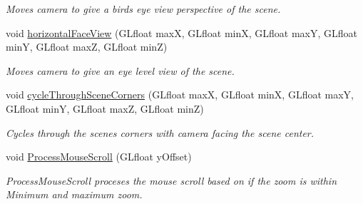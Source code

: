 \begin{DoxyCompactItemize}
\begin{DoxyCompactList}\small\item\em Moves camera to give a birds eye view perspective of the scene. \end{DoxyCompactList}\item 
\hypertarget{class_camera_aa5dbecd3eb846f229b325633ca62d711}{}void \hyperlink{class_camera_aa5dbecd3eb846f229b325633ca62d711}{horizontal\+Face\+View} (G\+Lfloat max\+X, G\+Lfloat min\+X, G\+Lfloat max\+Y, G\+Lfloat min\+Y, G\+Lfloat max\+Z, G\+Lfloat min\+Z)\label{class_camera_aa5dbecd3eb846f229b325633ca62d711}

\begin{DoxyCompactList}\small\item\em Moves camera to give an eye level view of the scene. \end{DoxyCompactList}\item 
\hypertarget{class_camera_aaf646454821cf05e45c5cd30d185d31a}{}void \hyperlink{class_camera_aaf646454821cf05e45c5cd30d185d31a}{cycle\+Through\+Scene\+Corners} (G\+Lfloat max\+X, G\+Lfloat min\+X, G\+Lfloat max\+Y, G\+Lfloat min\+Y, G\+Lfloat max\+Z, G\+Lfloat min\+Z)\label{class_camera_aaf646454821cf05e45c5cd30d185d31a}

\begin{DoxyCompactList}\small\item\em Cycles through the scenes corners with camera facing the scene center. \end{DoxyCompactList}\item 
void \hyperlink{class_camera_a70b8364d53d5851210baacf35b7bd837}{Process\+Mouse\+Scroll} (G\+Lfloat y\+Offset)
\begin{DoxyCompactList}\small\item\em Process\+Mouse\+Scroll proceses the mouse scroll based on if the zoom is within Minimum and maximum zoom. \end{DoxyCompactList}\end{DoxyCompactItemize}
